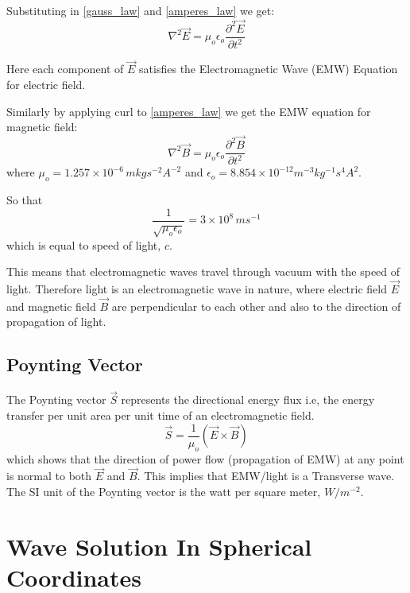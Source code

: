 Substituting in \eqref{gauss_law} and \eqref{amperes_law} we get:
%
   \begin{equation}
   \nabla^2\vec{E} =  \mu_{o}\epsilon_{o}\frac{\partial^2\vec{E}}{\partial t^2}
   \end{equation}

Here each component of $\vec{E}$ satisfies the Electromagnetic Wave (EMW) Equation for electric field.

Similarly by applying curl to \eqref{amperes_law} we get the EMW equation for magnetic field:
%
   \begin{equation}
   \nabla^2\vec{B} =  \mu_{o}\epsilon_{o}\frac{\partial^2\vec{B}}{\partial t^2}
   \end{equation}
%
where $\mu_{o} = 1.257\times10^{-6} \, m kg s^{-2} A^{-2}$ and $\epsilon_{o} = 8.854 \times 10^{-12} m^{-3} kg^{-1} s^4 A^2$.

So that
%
   \begin{equation}
   \frac{1}{\sqrt{\mu_{o}\epsilon_{o}}} = 3\times10^8 \, ms^{-1}
   \end{equation}
%
which is equal to speed of light, $c$.

This means that electromagnetic waves travel through vacuum with the speed of light. Therefore light is an electromagnetic wave in nature, where electric field $\vec{E}$ and magnetic field $\vec{B}$ are perpendicular to each other and also to the direction of propagation of light.


\subsection{Poynting Vector}

The Poynting vector $\vec{S}$ represents the directional energy flux i.e, the energy transfer per unit area per unit time of an electromagnetic field.
%
   \begin{equation}\label{eqn:poynting}
      \vec{S} = \frac{1}{\mu_{o}}(\vec{E}\times\vec{B})
   \end{equation}
%
which shows that the direction of power flow (propagation of EMW) at any point is normal to both $\vec{E}$ and $\vec{B}$. This implies that EMW/light is a Transverse wave. The SI unit of the Poynting vector is the watt per square meter, $W/m^{-2}$.


\section{Wave Solution In Spherical Coordinates}

